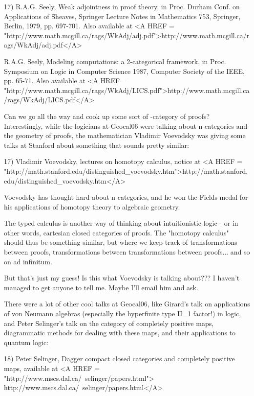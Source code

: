 17) R.A.G. Seely, Weak adjointness in proof theory, in Proc. Durham Conf. 
on Applications of Sheaves, Springer Lecture Notes in Mathematics 753, 
Springer, Berlin, 1979, pp. 697-701.  Also available at
<A HREF = "http://www.math.mcgill.ca/rags/WkAdj/adj.pdf">http://www.math.mcgill.ca/rags/WkAdj/adj.pdf</A>

R.A.G. Seely, Modeling computations: a 2-categorical framework, in 
Proc. Symposium on Logic in Computer Science 1987, Computer Society 
of the IEEE, pp. 65-71.  Also available at 
<A HREF = "http://www.math.mcgill.ca/rags/WkAdj/LICS.pdf">http://www.math.mcgill.ca/rags/WkAdj/LICS.pdf</A>

Can we go all the way and cook up some sort of \omega -category of proofs?  
Interestingly,
while the logicians at Geocal06 were talking about n-categories and
the geometry of proofs, the mathematician Vladimir Voevodsky was giving
some talks at Stanford about something that sounds pretty similar:

17) Vladimir Voevodsky, lectures on homotopy \lambda  calculus, 
notice at <A HREF = "http://math.stanford.edu/distinguished_voevodsky.htm">http://math.stanford.edu/distinguished_voevodsky.htm</A>  

Voevodsky has thought hard about n-categories, and he won the 
Fields medal for his applications of homotopy theory to algebraic 
geometry.  

The typed \lambda  calculus is another way of thinking about intuitionistic 
logic - or in other words, cartesian closed categories of proofs.  The 
"homotopy \lambda  calculus" should thus be something similar, but where 
we keep track of transformations between proofs, transformations
between transformations between proofs... and so on ad infinitum.

But that's just my guess!  Is this what Voevodsky is talking about???
I haven't managed to get anyone to tell me.  Maybe I'll email him and ask.

There were a lot of other cool talks at Geocal06, like Girard's talk
on applications of von Neumann algebras (especially the hyperfinite 
type II_{1} 
factor!) in logic, and Peter Selinger's talk on the category of
completely positive maps, diagrammatic methods for dealing with these
maps, and their applications to quantum logic:

18) Peter Selinger, Dagger compact closed categories and completely
positive maps, available at 
<A HREF = "http://www.mscs.dal.ca/~selinger/papers.html">
http://www.mscs.dal.ca/~selinger/papers.html</A>

